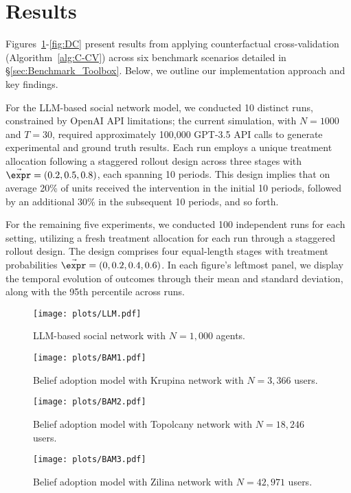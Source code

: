 \section{Results}
\label{sec:results}
% 
Figures~\ref{fig:LLM}-\ref{fig:DC} present results from applying counterfactual cross-validation (Algorithm~\ref{alg:C-CV}) across six benchmark scenarios detailed in \S\ref{sec:Benchmark_Toolbox}. Below, we outline our implementation approach and key findings.

For the LLM-based social network model, we conducted 10 distinct runs, constrained by OpenAI API limitations; the current simulation, with $N=1000$ and $T=30$, required approximately 100,000 GPT-3.5 API calls to generate experimental and ground truth results. Each run employs a unique treatment allocation following a staggered rollout design across three stages with $\Vec{\expr} = (0.2, 0.5, 0.8)$, each spanning 10 periods. This design implies that on average 20\% of units received the intervention in the initial 10 periods, followed by an additional 30\% in the subsequent 10 periods, and so forth.

For the remaining five experiments, we conducted 100 independent runs for each setting, utilizing a fresh treatment allocation for each run through a staggered rollout design. The design comprises four equal-length stages with treatment probabilities $\Vec{\expr} = (0, 0.2, 0.4, 0.6)$. In each figure's leftmost panel, we display the temporal evolution of outcomes through their mean and standard deviation, along with the 95th percentile across runs.

\begin{figure}
    \centering
    \texttt{[image: plots/LLM.pdf]}
    \caption{LLM-based social network with $N=1,000$ agents.}
    \label{fig:LLM}
\end{figure}

\begin{figure}
    \centering
    \texttt{[image: plots/BAM1.pdf]}
    \caption{Belief adoption model with Krupina network with $N=3,366$ users.}
    \label{fig:BAM1}
\end{figure}

\begin{figure}
    \centering
    \texttt{[image: plots/BAM2.pdf]}
    \caption{Belief adoption model with Topolcany network with $N=18,246$ users.}
    \label{fig:BAM2}
\end{figure}

\begin{figure}
    \centering
    \texttt{[image: plots/BAM3.pdf]}
    \caption{Belief adoption model with Zilina network with $N=42,971$ users.}
    \label{fig:BAM3}
\end{figure}

